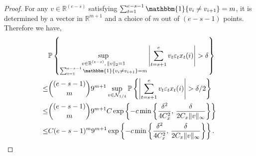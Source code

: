 \documentclass[twoside]{article}
\begin{document}
\begin{proof}
For any $v \in \mathbb{R}^{(e-s)}$ satisfying $\sum_{t = 1}^{e-s-1}\mathbbm{1}\{v_i \neq v_{i+1}\} = m$, it is determined by a vector in $\mathbb{R}^{m+1}$ and a choice of $m$ out of $(e-s-1)$ points.  Therefore we have,
	\begin{align*}
		& \mathbb{P}\left\{\sup_{\substack{v \in \mathbb{R}^{(e-s)}, \, \|v\|_2 = 1\\ \sum_{t = 1}^{e-s-1} \mathbbm{1}\{v_i \neq v_{i+1}\} = m}} \left|\sum_{t = s+1}^e v_t \varepsilon_t x_t(i)\right| > \delta \right\} \\
		\leq & {(e-s-1) \choose m} 9^{m+1} \sup_{v \in \mathcal{N}_{1/4}}	\mathbb{P}\left\{\left|\sum_{t = s+1}^e v_t \varepsilon_t x_t(i)\right| > \delta/2 \right\} \\
		\leq & {(e-s-1) \choose m} 9^{m+1} C\exp \left\{-c \min\left\{\frac{\delta^2}{4C_x^2}, \, \frac{\delta}{2C_x \|v\|_{\infty}}\right\}\right\} \\
		\leq & C(e-s-1)^m 9^{m+1} \exp \left\{-c \min\left\{\frac{\delta^2}{4C_x^2}, \, \frac{\delta}{2C_x \|v\|_{\infty}}\right\}\right\}.
	\end{align*}

\end{proof}
\end{document}
